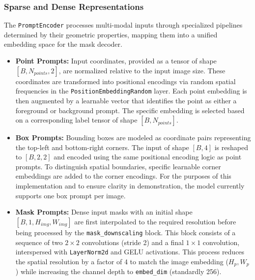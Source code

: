 \subsubsection{Sparse and Dense Representations}
The \texttt{PromptEncoder} processes multi-modal inputs through specialized pipelines determined by their geometric properties, mapping them into a unified embedding space for the mask decoder.

\begin{itemize}
	\item \textbf{Point Prompts:} Input coordinates, provided as a tensor of shape $[B, N_{points}, 2]$, are normalized relative to the input image size. These coordinates are transformed into positional encodings via random spatial frequencies in the \texttt{PositionEmbeddingRandom} layer. Each point embedding is then augmented by a learnable vector that identifies the point as either a foreground or background prompt. The specific embedding is selected based on a corresponding label tensor of shape $[B, N_{points}]$.
	
	\item \textbf{Box Prompts:} Bounding boxes are modeled as coordinate pairs representing the top-left and bottom-right corners. The input of shape $[B, 4]$ is reshaped to $[B, 2, 2]$ and encoded using the same positional encoding logic as point prompts. To distinguish spatial boundaries, specific learnable corner embeddings are added to the corner encodings. For the purposes of this implementation and to ensure clarity in demonstration, the model currently supports one box prompt per image.
	
	\item \textbf{Mask Prompts:} Dense input masks with an initial shape \\ $[B, 1, H_{img}, W_{img}]$ are first interpolated to the required resolution before being processed by the \texttt{mask\_downscaling} block. This block consists of a sequence of two $2\times2$ convolutions (stride 2) and a final $1\times1$ convolution, interspersed with \texttt{LayerNorm2d} and GELU activations. This process reduces the spatial resolution by a factor of 4 to match the image embedding ($H_p, W_p$) while increasing the channel depth to \texttt{embed\_dim} (standardly 256).
\end{itemize}


